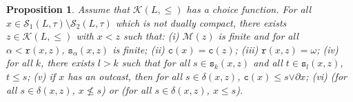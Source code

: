 \documentclass{article}
\newtheorem{proposition}[theorem]{Proposition}
\begin{document}
\begin{proposition}\label{proposition.isolated.from.above.direct}
    Assume that $\mathcal{K}(L,\le)$ has a choice function. {For all $x \in \mathcal{S}_1(L,\tau) \setminus \mathcal{S}_2(L,\tau)$ which is not dually compact, there exists $z \in \mathcal{K}(L,\le)$ with $x < z$ such that: (i) $\mathcal{M}(z)$ is finite and for all $\alpha < \texttt{r}(x,z)$, $\texttt{s}_{\alpha}(x,z)$ is finite; (ii) $\texttt{c}(x) = \texttt{c}(z)$; (iii) $\texttt{r}(x,z) = \omega$; (iv) for all $k$, there exists $l > k$ such that for all $s \in \texttt{s}_{k}(x,z)$ and all $t \in \texttt{s}_{l}(x,z)$, $t \le s$; 
    (v) if $x$ has an outcast, then for all $s \in \delta(x,z)$, $\texttt{c}(x) \le s {\vee \partial x}$; (vi) (for all $s \in \delta(x,z)$, $x \not \le s$) or (for all $s \in \delta(x,z)$, $x \le s$).}
\end{proposition}
\end{document}
